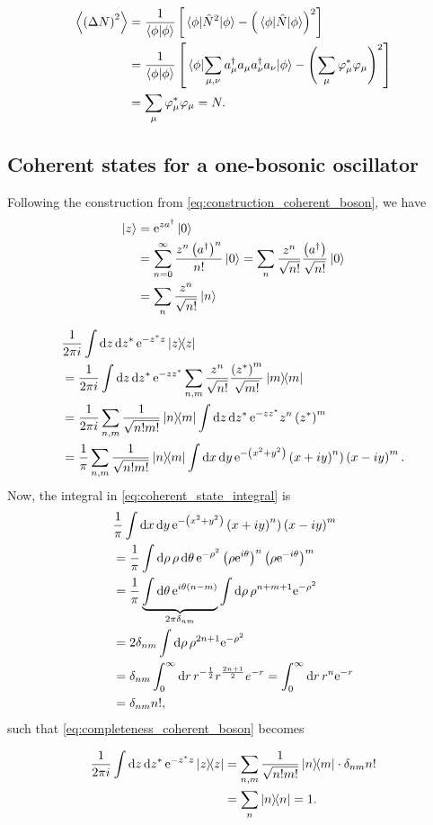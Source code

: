 \begin{align}
\ev{\left(\Delta N \right)^2} &= \frac{1}{\braket{\phi}}\left[ \ev{\hat{N}^2}{\phi} - \left( \ev{\hat{N}}{\phi}\right)^2\right] \\
&= \frac{1}{\braket{\phi}}\left[\ev{\sum_{\mu, \nu}a_\mu^\dagger a_\mu a_\nu^\dagger a_\nu}{\phi} - \left(\sum_\mu\varphi_\mu^*\varphi_\mu\right)^2\right]\\
\label{unc:expvalN2}
&= \sum_\mu\varphi_\mu^*\varphi_\mu = N.
\end{align}

\subsection{Coherent states for a one-bosonic oscillator}

Following the construction from \eqref{eq:construction_coherent_boson}, we have
\begin{align}
\ket{z} &= \mathrm{e}^{za^\dagger}\ket 0 \\
&= \sum_{n=0}^\infty \frac{z^n\left(a^\dagger\right)^n}{n!}\ket{0} = \sum_n \frac{z^n}{\sqrt{n!}}\frac{\left(a^\dagger\right)}{\sqrt{n!}}\ket 0 \\
&= \sum_n\frac{z^n}{\sqrt{n!}}\ket n
\end{align}

\begin{align}
\label{eq:completeness_coherent_boson}
&\frac{1}{2\pi i}\int\dd z \dd{z^*}\e^{-z^*z}\dyad z \\
&= \frac{1}{2\pi i}\int \dd z \dd{z^*}\e^{-zz^*}\sum_{n,m}\frac{z^n}{\sqrt{n!}}\frac{\left(z^*\right)^m}{\sqrt{m!}}\dyad m \\
&= \frac{1}{2\pi i}\sum_{n, m}\frac{1}{\sqrt{n!m!}}\dyad{n}{m}\int\dd z \dd{z^*}\e^{-zz^*}z^n\left(z^*\right)^m \\
&= \frac{1}{\pi}\sum_{n, m}\frac{1}{\sqrt{n!m!}}\dyad{n}{m}\int \dd{x}\dd{y} \e^{-\left(x^2 + y^2\right)}\left(x+iy\right)^n)\left(x-iy\right)^m. \label{eq:coherent_state_integral}
\end{align}
Now, the integral in \eqref{eq:coherent_state_integral} is
\begin{align}
&\frac{1}{\pi}\int\dd{x}\dd{y}\mathrm{e}^{-\left(x^2 + y^2\right)}\left(x+iy\right)^n)\left(x-iy\right)^m \nonumber \\
&= \frac{1}{\pi} \int \dd{\rho}\rho\dd{\theta}\mathrm{e}^{-\rho^2}\left(\rho\mathrm{e}^{i\theta}\right)^n\left(\rho\mathrm{e}^{-i\theta}\right)^m\nonumber \\
&= \frac{1}{\pi}\underbrace{\int\dd{\theta}\mathrm{e}^{i\theta(n-m)}}_{2\pi\delta_{nm}}\int\dd{\rho}\rho^{n+m+1}\mathrm{e}^{-\rho^2}\nonumber \\
&= 2\delta_{nm}\int\dd{\rho}\rho^{2n+1}\mathrm{e}^{-\rho^2}\nonumber\\ 
&= \delta_{nm}\int_0^\infty\dd{r}r^{-\frac{1}{2}}r^{\frac{2n+1}{2}}e^{-r} = \int_0^\infty\dd{r}r^n\mathrm{e}^{-r} \nonumber\\
&= \delta_{nm}n!,
\end{align}
such that \eqref{eq:completeness_coherent_boson} becomes

\begin{align*}
\frac{1}{2\pi i}\int\dd z \dd{z^*}\e^{-z^*z}\dyad z &= \sum_{n, m}\frac{1}{\sqrt{n!m!}}\dyad{n}{m}\cdot \delta_{nm}n! \\
&= \sum_{n}\dyad{n} = 1.
\end{align*}